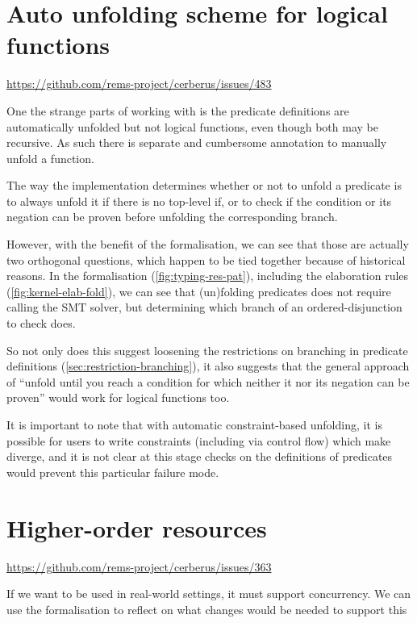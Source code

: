 \section{Auto unfolding scheme for logical functions}\label{sec:auto-unfold-functions}

\url{https://github.com/rems-project/cerberus/issues/483}

One the strange parts of working with  is the predicate definitions are
automatically unfolded but not logical functions, even though both may be
recursive. As such there is separate and cumbersome annotation to manually
unfold a function.

The way the implementation determines whether or not to unfold a predicate is
to always unfold it if there is no top-level if, or to check if the condition
or its negation can be proven before unfolding the corresponding branch.

However, with the benefit of the formalisation, we can see that those are
actually two orthogonal questions, which happen to be tied together because of
historical reasons. In the formalisation (\cref{fig:typing-res-pat}), including
the elaboration rules (\cref{fig:kernel-elab-fold}),  we can see that (un)folding %
predicates does not require calling the SMT solver, but determining which
branch of an ordered-disjunction to check does.

So not only does this suggest loosening the restrictions on branching in
predicate definitions (\cref{sec:restriction-branching}), it also suggests that
the general approach of ``unfold until you reach a condition for which neither
it nor its negation can be proven'' would work for logical functions too.

It is important to note that with automatic constraint-based unfolding, it is
possible for users to write constraints (including via control flow) which make
 diverge, and it is not clear at this stage checks on the definitions
of predicates would prevent this particular failure
mode.

\section{Higher-order resources}
\url{https://github.com/rems-project/cerberus/issues/363}

If we want  to be used in real-world settings, it must support
concurrency. We can use the formalisation to reflect on what changes
would be needed to support this

